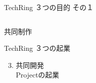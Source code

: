 \documentclass[dvipdfmx]{beamer}
\begin{document}
\begin{frame}{TechRing ３つの目的 その１}
\begin{columns}
    \begin{column}{0.30\textwidth}
      \begin{block}{共同制作}
        \begin{footnotesize}
          TechRing ３つの起業 \par
          \begin{enumerate}
            \setcounter{enumi}{2}
            \item 共同開発\\Projectの起業
          \end{enumerate}
        \end{footnotesize}
      \end{block}
    \end{column}
  \end{columns}
\end{frame}
\end{document}
